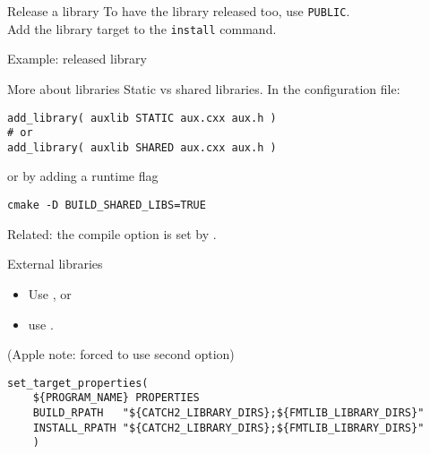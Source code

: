 \begin{numberedframe}{Release a library}
  To have the library released too, use \lstinline{PUBLIC}.\\
  Add the library target to the \lstinline{install} command.
\end{numberedframe}

\begin{numberedframe}{Example: released library}
  \lstset{numbers=left,numberstyle=\tiny}
    
\end{numberedframe}

\begin{numberedframe}{More about libraries}
  Static vs shared libraries.
  In the configuration file:
\begin{lstlisting}
add_library( auxlib STATIC aux.cxx aux.h )
# or
add_library( auxlib SHARED aux.cxx aux.h )
\end{lstlisting}
  or by adding a runtime flag
\begin{lstlisting}
cmake -D BUILD_SHARED_LIBS=TRUE
\end{lstlisting}
Related: the  compile option
is set by .
\end{numberedframe}

\begin{numberedframe}{External libraries}
  \begin{itemize}
  \item Use , or
  \item use .
  \end{itemize}
  (Apple note: forced to use second option)
\begin{lstlisting}
set_target_properties(
	${PROGRAM_NAME} PROPERTIES
	BUILD_RPATH   "${CATCH2_LIBRARY_DIRS};${FMTLIB_LIBRARY_DIRS}"
	INSTALL_RPATH "${CATCH2_LIBRARY_DIRS};${FMTLIB_LIBRARY_DIRS}"
    )
\end{lstlisting}
\end{numberedframe}
\endinput

\begin{numberedframe}{}
  \begin{itemize}
  \item 
  \end{itemize}
\begin{lstlisting}
\end{lstlisting}
\end{numberedframe}

